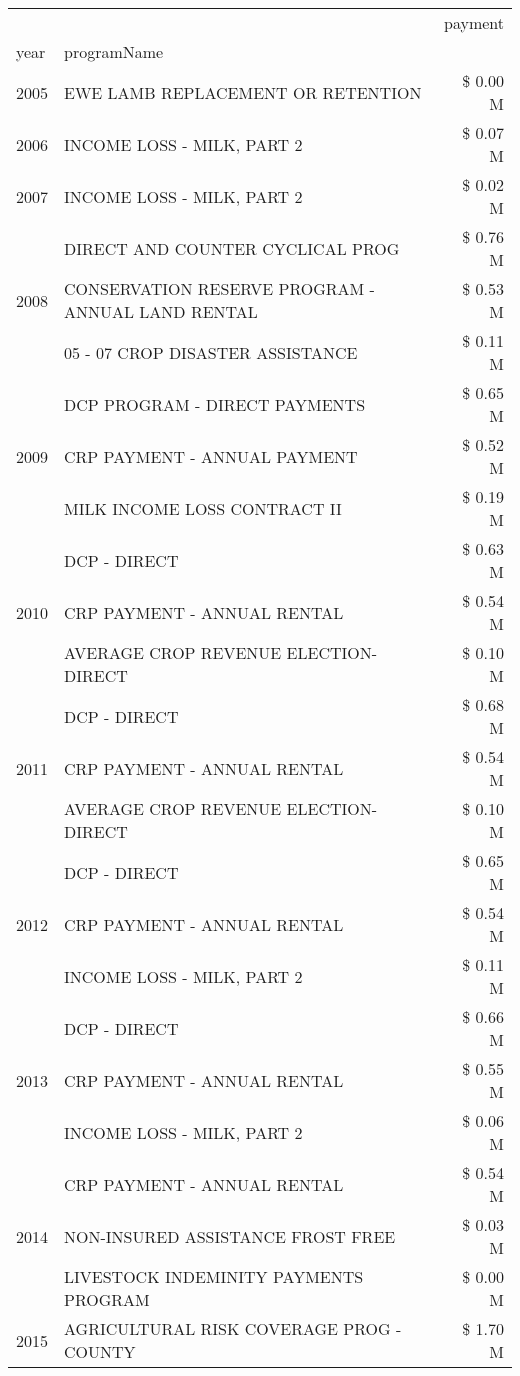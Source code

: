 \begin{tabular}{llr}
\toprule
 &  & payment \\
year & programName &  \\
\midrule
2005 & EWE LAMB REPLACEMENT OR RETENTION & \$ 0.00 M \\
\cline{1-3}
2006 & INCOME LOSS - MILK, PART 2 & \$ 0.07 M \\
\cline{1-3}
2007 & INCOME LOSS - MILK, PART 2 & \$ 0.02 M \\
\cline{1-3}
\multirow[t]{3}{*}{2008} & DIRECT AND COUNTER CYCLICAL PROG & \$ 0.76 M \\
 & CONSERVATION RESERVE PROGRAM - ANNUAL LAND RENTAL & \$ 0.53 M \\
 & 05 - 07 CROP DISASTER ASSISTANCE & \$ 0.11 M \\
\cline{1-3}
\multirow[t]{3}{*}{2009} & DCP PROGRAM - DIRECT PAYMENTS & \$ 0.65 M \\
 & CRP PAYMENT - ANNUAL PAYMENT & \$ 0.52 M \\
 & MILK INCOME LOSS CONTRACT II & \$ 0.19 M \\
\cline{1-3}
\multirow[t]{3}{*}{2010} & DCP - DIRECT & \$ 0.63 M \\
 & CRP PAYMENT - ANNUAL RENTAL & \$ 0.54 M \\
 & AVERAGE CROP REVENUE ELECTION-DIRECT & \$ 0.10 M \\
\cline{1-3}
\multirow[t]{3}{*}{2011} & DCP - DIRECT & \$ 0.68 M \\
 & CRP PAYMENT - ANNUAL RENTAL & \$ 0.54 M \\
 & AVERAGE CROP REVENUE ELECTION-DIRECT & \$ 0.10 M \\
\cline{1-3}
\multirow[t]{3}{*}{2012} & DCP - DIRECT & \$ 0.65 M \\
 & CRP PAYMENT - ANNUAL RENTAL & \$ 0.54 M \\
 & INCOME LOSS - MILK, PART 2 & \$ 0.11 M \\
\cline{1-3}
\multirow[t]{3}{*}{2013} & DCP - DIRECT & \$ 0.66 M \\
 & CRP PAYMENT - ANNUAL RENTAL & \$ 0.55 M \\
 & INCOME LOSS - MILK, PART 2 & \$ 0.06 M \\
\cline{1-3}
\multirow[t]{3}{*}{2014} & CRP PAYMENT - ANNUAL RENTAL & \$ 0.54 M \\
 & NON-INSURED ASSISTANCE FROST FREE & \$ 0.03 M \\
 & LIVESTOCK INDEMINITY PAYMENTS PROGRAM & \$ 0.00 M \\
\cline{1-3}
\multirow[t]{3}{*}{2015} & AGRICULTURAL RISK COVERAGE PROG - COUNTY & \$ 1.70 M \\

\end{tabular}
